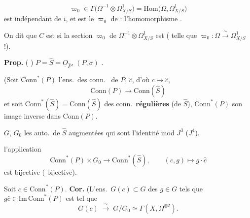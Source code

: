 \documentclass[11pt,a4paper]{article}
\begin{document}
\[
  \varpi_0 \in \Gamma\bigl(\Omega^{-1} \otimes \Omega^1_{X/S}\bigr)
  = \mathrm{Hom}\bigl(\Omega, \Omega^1_{X/S}\bigr)
\]
est indépendant de $i$, et est le $\varpi_0$ de \ill{} : l'homomorphisme \ill{}.

On dit que $C$ est  \textbf{} si la
section $\varpi_0$ de $\Omega^{-1} \otimes \Omega^1_{X/S}$ est
\textbf{}
(\struck{\ill{}} telle que $\varpi_0 : \Omega \xrightarrow{\ \sim\ } \Omega^1_{X/S}$ !).

\textbf{Prop.} ( ) $P = \widehat{S} = \underline{O}_{\widehat{P}}$, \ill{} $(P,\sigma)$ \ill{}.

(Soit $\mathrm{Conn}^{*}(P)$  l'ens.\ des
conn.\ \ill{} de $P$,  $\hat{c}$, d'où
$c \longmapsto \hat{c}$,
\[
  \mathrm{Conn}(P) \longrightarrow \mathrm{Conn}(\widehat{S})
\]
et soit $\mathrm{Conn}^{*}(\widehat{S}) = \mathrm{Conn}(\widehat{S})$ \ill{} des
conn.\ \textbf{régulières} (de $\widehat{S}$), $\mathrm{Conn}^{*}(P)$ son
image inverse dans $\mathrm{Conn}(P)$.

 $G$, $G_0$ les  \ill{} auto.\ de $\widehat{S}$
augmentées qui sont l'identité mod $J^3$ ($J^4$).

 \struck{\ill{}} l'application
\[
  \mathrm{Conn}^{*}(P) \times G_0 \longrightarrow \mathrm{Conn}^{*}(\widehat{S}),
  \qquad (c,g) \longmapsto g\cdot\hat{c}
\]
\ill{} est bijective (\ill{} bijective).

Soit $c \in \mathrm{Conn}^{*}(P)$. \textbf{Cor.} (L'ens.\ $G(c) \subset G$ des
$g \in G$ tels que $g\hat{c} \in \mathrm{Im}\,\mathrm{Conn}^{*}(P)$ est tel que
\[
  G(c) \;\xrightarrow{\ \sim\ }\; G/G_0 \simeq \Gamma(X, \Omega^{\otimes 2}).
\]
\end{document}
